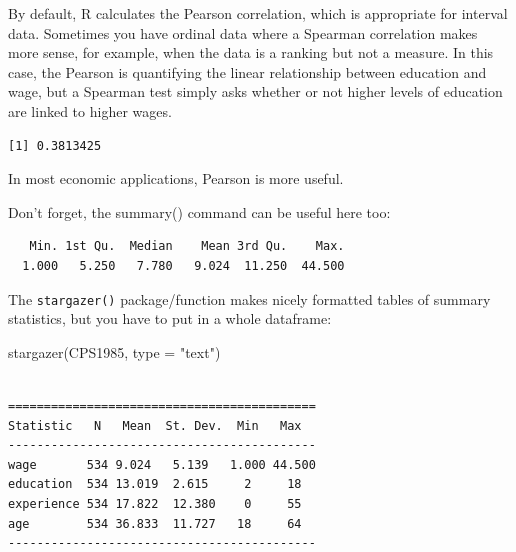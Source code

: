 \documentclass[
  letterpaper,
]{book}
\newenvironment{Shaded}{\begin{snugshade}}{\end{snugshade}}
\newcommand{\AttributeTok}[1]{\textcolor[rgb]{0.40,0.45,0.13}{#1}}
\newcommand{\FunctionTok}[1]{\textcolor[rgb]{0.28,0.35,0.67}{#1}}
\newcommand{\NormalTok}[1]{\textcolor[rgb]{0.00,0.23,0.31}{#1}}
\newcommand{\SpecialCharTok}[1]{\textcolor[rgb]{0.37,0.37,0.37}{#1}}
\newcommand{\StringTok}[1]{\textcolor[rgb]{0.13,0.47,0.30}{#1}}
\begin{document}
By default, R calculates the Pearson correlation, which is appropriate
for interval data. Sometimes you have ordinal data where a Spearman
correlation makes more sense, for example, when the data is a ranking
but not a measure. In this case, the Pearson is quantifying the linear
relationship between education and wage, but a Spearman test simply asks
whether or not higher levels of education are linked to higher wages.

\begin{Shaded}
\end{Shaded}

\begin{verbatim}
[1] 0.3813425
\end{verbatim}

In most economic applications, Pearson is more useful.

Don't forget, the summary() command can be useful here too:

\begin{Shaded}
\end{Shaded}

\begin{verbatim}
   Min. 1st Qu.  Median    Mean 3rd Qu.    Max. 
  1.000   5.250   7.780   9.024  11.250  44.500 
\end{verbatim}

The \texttt{stargazer()} package/function makes nicely formatted tables
of summary statistics, but you have to put in a whole dataframe:

\begin{Shaded}
\begin{Highlighting}[]
\FunctionTok{stargazer}\NormalTok{(CPS1985, }\AttributeTok{type =} \StringTok{"text"}\NormalTok{)}
\end{Highlighting}
\end{Shaded}

\begin{verbatim}

===========================================
Statistic   N   Mean  St. Dev.  Min   Max  
-------------------------------------------
wage       534 9.024   5.139   1.000 44.500
education  534 13.019  2.615     2     18  
experience 534 17.822  12.380    0     55  
age        534 36.833  11.727   18     64  
-------------------------------------------
\end{verbatim}
\end{document}
